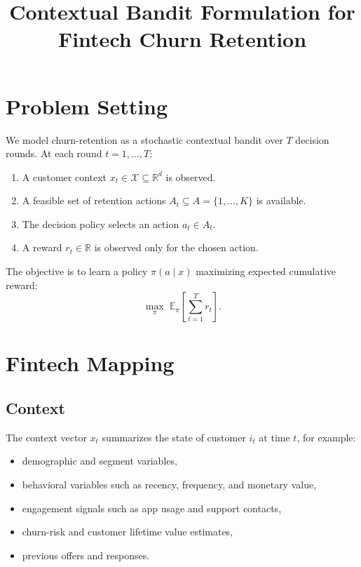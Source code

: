 \documentclass[11pt,a4paper]{article}
\title{Contextual Bandit Formulation for Fintech Churn Retention}
\author{}
\date{}
\begin{document}
\maketitle

\section{Problem Setting}

We model churn-retention as a stochastic contextual bandit over \(T\) decision rounds.  
At each round \(t=1,\dots,T\):

\begin{enumerate}[label=\arabic*.]
    \item A customer context \(x_t \in \mathcal{X} \subseteq \mathbb{R}^d\) is observed.
    \item A feasible set of retention actions \(A_t \subseteq A=\{1,\dots,K\}\) is available.
    \item The decision policy selects an action \(a_t \in A_t\).
    \item A reward \(r_t \in \mathbb{R}\) is observed only for the chosen action.
\end{enumerate}

The objective is to learn a policy \(\pi(a \mid x)\) maximizing expected cumulative reward:
\[
\max_{\pi} \; \mathbb{E}_{\pi}\left[\sum_{t=1}^T r_t\right].
\]

\section{Fintech Mapping}

\subsection*{Context}

The context vector \(x_t\) summarizes the state of customer \(i_t\) at time \(t\), for example:
\begin{itemize}
    \item demographic and segment variables,
    \item behavioral variables such as recency, frequency, and monetary value,
    \item engagement signals such as app usage and support contacts,
    \item churn-risk and customer lifetime value estimates,
    \item previous offers and responses.
\end{itemize}
\end{document}
